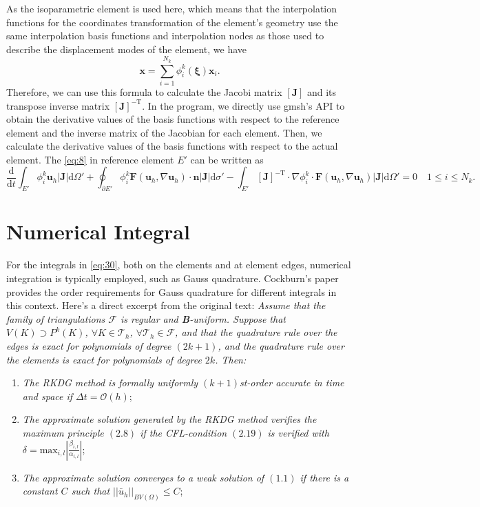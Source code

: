 \documentclass{develop-note}
\begin{document}
As the isoparametric element is used here, which means that the interpolation functions for the coordinates transformation of the element's geometry use the same interpolation basis functions and interpolation nodes as those used to describe the displacement modes of the element, we have
\begin{equation}
  \mathbf{x}=\sum_{i=1}^{N_{k}}\phi_{i}^{k}(\bm{\xi})\mathbf{x}_{i}.
\end{equation}
Therefore, we can use this formula to calculate the Jacobi matrix $[\mathbf{J}]$ and its transpose inverse matrix $[\mathbf{J}]^{-\mathrm{T}}$. In the program, we directly use gmsh's API to obtain the derivative values of the basis functions with respect to the reference element and the inverse matrix of the Jacobian for each element. Then, we calculate the derivative values of the basis functions with respect to the actual element. The \autoref{eq:8} in reference element $E'$ can be written as
\begin{equation}
  \label{eq:30}
  \dfrac{\mathrm{d}}{\mathrm{d}t}\int_{E'}\phi_{i}^{k}\mathbf{u}_{h}|\mathbf{J}|\mathrm{d}\Omega'+\oint_{\partial E'}\phi_{i}^{k}\mathbf{F}(\mathbf{u}_{h},\nabla\mathbf{u}_{h})\cdot\mathbf{n}|\mathbf{J}|\mathrm{d}\sigma'-\int_{E'}[\mathbf{J}]^{-\mathrm{T}}\cdot\nabla\phi_{i}^{k}\cdot\mathbf{F}(\mathbf{u}_{h},\nabla\mathbf{u}_{h})|\mathbf{J}|\mathrm{d}\Omega'=0\quad 1\leqslant i\leqslant N_{k}.
\end{equation}

\section{Numerical Integral}

For the integrals in \autoref{eq:30}, both on the elements and at element edges, numerical integration is typically employed, such as Gauss quadrature. Cockburn's paper\cite{cockburnRungeKuttaLocalProjection1990} provides the order requirements for Gauss quadrature for different integrals in this context. Here's a direct excerpt from the original text: \textit{Assume that the family of triangulations $\mathscr{F}$ is regular and \textbf{B}-uniform. Suppose that $V(K)\supset P^{k}(K)$, $\forall K\in\mathscr{T}_{h}$, $\forall\mathscr{T}_{h}\in\mathscr{F}$, and that the quadrature rule over the edges is exact for polynomials of degree $(2k +1)$, and the quadrature rule over the elements is exact for polynomials of degree $2k$. Then:}
\begin{enumerate}
  \item \textit{The RKDG method is formally uniformly $(k+1)$st-order accurate in time and space if $\Delta t=\mathcal{O}(h)$};
  \item \textit{The approximate solution generated by the RKDG method verifies the maximum principle $(2.8)$ if the CFL-condition $(2.19)$ is verified with $\delta=\mathrm{max}_{i,l}\left|\frac{\beta_{i,l}}{\alpha_{i,l}}\right|$};
  \item \textit{The approximate solution converges to a weak solution of $(1.1)$ if there is a constant $C$ such that $||\bar{u}_{h}||_{BV(\Omega)}\le C$};
\end{enumerate}
\end{document}
